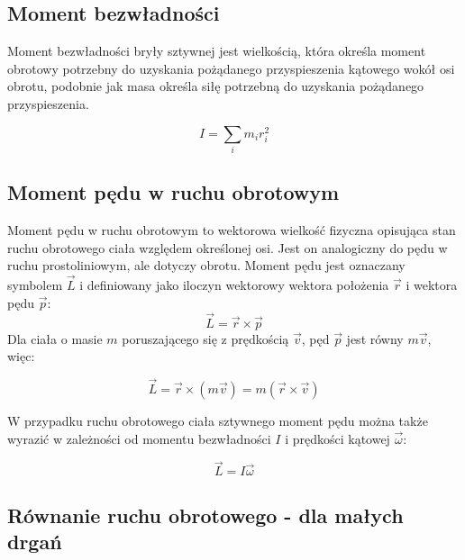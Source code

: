 \documentclass{article}
\theoremstyle{definition}
\theoremstyle{definition}
\theoremstyle{definition}
\theoremstyle{definition}
\begin{document}
\subsection{Moment bezwładności}
Moment bezwładności bryły sztywnej jest wielkością, która określa moment obrotowy potrzebny do uzyskania pożądanego przyspieszenia kątowego wokół osi obrotu, podobnie jak masa określa siłę potrzebną do uzyskania pożądanego przyspieszenia.

\[ I = \sum_{i} m_i r_i^2 \]

\subsection{Moment pędu w ruchu obrotowym}

Moment pędu w ruchu obrotowym to wektorowa wielkość fizyczna opisująca stan ruchu obrotowego ciała względem określonej osi. Jest on analogiczny do pędu w ruchu prostoliniowym, ale dotyczy obrotu. Moment pędu jest oznaczany symbolem \(\vec{L}\) i definiowany jako iloczyn wektorowy wektora położenia \(\vec{r}\) i wektora pędu \(\vec{p}\):
\[
\vec{L} = \vec{r} \times \vec{p}
\]
Dla ciała o masie \(m\) poruszającego się z prędkością \(\vec{v}\), pęd \(\vec{p}\) jest równy \(m\vec{v}\), więc:

\[
\vec{L} = \vec{r} \times (m\vec{v}) = m (\vec{r} \times \vec{v})
\]

W przypadku ruchu obrotowego ciała sztywnego moment pędu można także wyrazić w zależności od momentu bezwładności \(I\) i prędkości kątowej \(\vec{\omega}\):

\[
\vec{L} = I \vec{\omega}
\]

\subsection{Równanie ruchu obrotowego - dla małych drgań}
\end{document}

